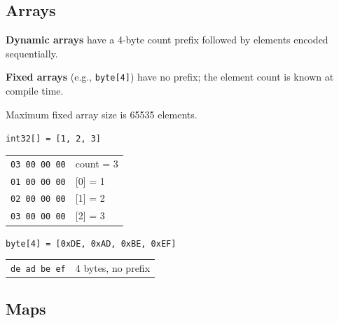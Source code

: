 \documentclass[10pt,onecolumn]{article}
\begin{document}
\subsection{Arrays}

\begin{minipage}[t]{0.48\textwidth}
\raggedright
\textbf{Dynamic arrays} have a 4-byte count prefix followed by elements encoded sequentially.

\vspace{6pt}
\textbf{Fixed arrays} (e.g., \texttt{byte[4]}) have no prefix; the element count is known at compile time.

\vspace{6pt}
Maximum fixed array size is 65535 elements.
\end{minipage}\hfill
\begin{minipage}[t]{0.48\textwidth}
\small
\texttt{int32[] = [1, 2, 3]}
\vspace{4pt}

\begin{tabular}[t]{@{}r@{\quad}l@{}}
\texttt{03 00 00 00} & count = 3 \\
\texttt{01 00 00 00} & {[0]} = 1 \\
\texttt{02 00 00 00} & {[1]} = 2 \\
\texttt{03 00 00 00} & {[2]} = 3 \\
\end{tabular}

\vspace{8pt}
\texttt{byte[4] = [0xDE, 0xAD, 0xBE, 0xEF]}
\vspace{4pt}

\begin{tabular}[t]{@{}r@{\quad}l@{}}
\texttt{de ad be ef} & 4 bytes, no prefix \\
\end{tabular}
\end{minipage}


\subsection{Maps}
\end{document}
